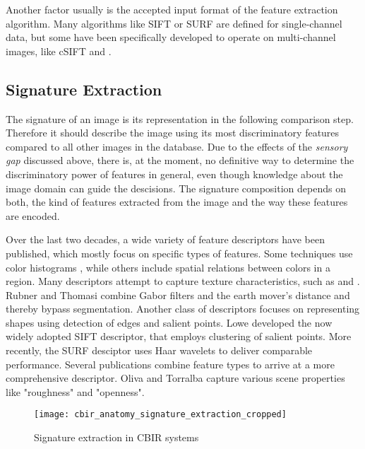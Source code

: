 Another factor usually is the accepted input format of the feature extraction
algorithm. Many algorithms like SIFT \autocite{lowe_object_1999} or SURF
\autocite{bay_speeded-up_2008} are defined for single-channel data, but some
have been specifically developed to operate on multi-channel images, like cSIFT
\autocite{abdel-hakim_csift:_2006} and \autocite{yang_robust_2008}.

\subsection{Signature Extraction}\label{sec:anatomy_signature_extraction}

The signature of an image is its representation in the following comparison
step. Therefore it should describe the image using its most discriminatory
features compared to all other images in the database. Due to the effects of
the \emph{sensory gap} discussed above, there is, at the moment, no definitive
way to determine the discriminatory power of features in general, even though
knowledge about the image domain can guide the descisions.  The signature
composition depends on both, the kind of features extracted from the image and
the way these features are encoded. 

Over the last two decades, a wide variety of feature descriptors have been
published, which mostly focus on specific types of features. Some techniques
use color histograms \autocite{utenpattanant_color_2006}, while others
\autocite{stricker_color_1996} \autocite{deng_efficient_2001}
\autocite{lee_spatial_2003} include spatial relations between colors in a
region.
Many descriptors attempt to capture texture characteristics, such as
\autocite{schaffalitzky_viewpoint_2001} and \autocite{manjunath_texture_1996}.
Rubner and Thomasi \autocite{rubner_texture-based_1999} combine Gabor filters
and the earth mover's distance and thereby bypass segmentation.
Another class of descriptors focuses on representing shapes using detection of
edges and salient points. Lowe \autocite{lowe_object_1999} developed the now
widely adopted SIFT descriptor, that employs clustering of salient points. More
recently, the SURF desciptor \autocite{bay_speeded-up_2008} uses Haar wavelets
to deliver comparable performance.
Several publications combine feature types to arrive at a more comprehensive
descriptor. Oliva and Torralba \autocite{oliva_modeling_2001} capture various
scene properties like "roughness" and "openness".

\begin{figure}[h]
    \centering
        \texttt{[image: cbir\_anatomy\_signature\_extraction\_cropped]}
    \caption{Signature extraction in CBIR systems}
    \label{fig:cbir_signature_extraction}
\end{figure}

